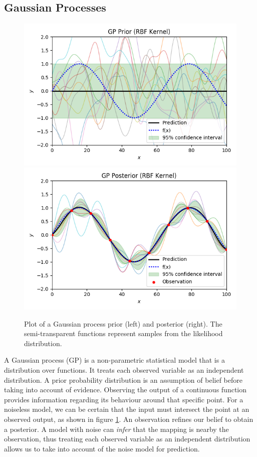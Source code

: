 \documentclass[ %
author={Dillon Keith Diep},
supervisor={Dr. Carl Henrik Ek},
degree={MEng},
title={ART-CG Hair:},
subtitle={Assisted Real-time Content Generation of Stylised Virtual Hair},
type={Research},
year={2017} ]{dissertation}
\begin{document}
	\subsection{Gaussian Processes}
	\begin{figure}[!h]
		\centering
		\includegraphics[scale=0.5]{images/gpPrior}
		\includegraphics[scale=0.5]{images/gpPosterior}
		\caption{Plot of a Gaussian process prior (left) and posterior (right). The semi-transparent functions represent samples from the likelihood distribution.}
		\label{gpplot}
	\end{figure}
	A Gaussian process (GP) is a non-parametric statistical model that is a distribution over functions. It treats each observed variable as an independent distribution. A prior probability distribution is an assumption of belief before taking into account of evidence. Observing the output of a continuous function provides information regarding its behaviour around that specific point. For a noiseless model, we can be certain that the input must intersect the point at an observed output, as shown in figure \ref{gpplot}. An observation refines our belief to obtain a posterior. A model with noise can \textit{infer} that the mapping is nearby the observation, thus treating each observed variable as an independent distribution allows us to take into account of the noise model for prediction.
	
\end{document}
